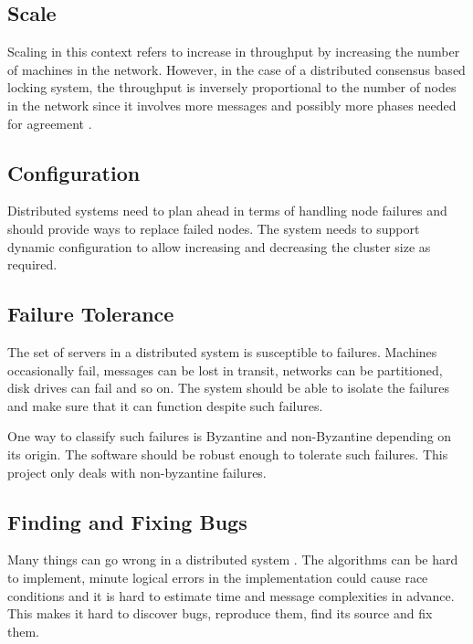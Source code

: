 \subsection{Scale}

Scaling in this context refers to increase in throughput by increasing the
number of machines in the network. However, in the case of a distributed 
consensus based locking system, the throughput is inversely proportional to the
number of nodes in the network since it involves more messages and possibly
more phases needed for agreement%
.

\subsection{Configuration}

Distributed systems need to plan ahead in terms of handling node failures and
should provide ways to replace failed nodes. The system needs to support dynamic
configuration to allow increasing and decreasing the cluster size as required.

\subsection{Failure Tolerance}

The set of servers in a distributed system is susceptible to failures.
Machines occasionally fail, messages can be lost in transit, networks can be
partitioned, disk drives can fail and so on. The system should be able to
isolate the failures and make sure that it can function despite such failures.

One way to classify such failures is Byzantine%
and non-Byzantine%
depending on its origin. The software should be robust enough to tolerate such
failures. This project only deals with non-byzantine failures.

\subsection{Finding and Fixing Bugs}

Many things can go wrong in a distributed system 
\citep{Rotem-gal-oz_fallaciesof}. The algorithms can be hard to implement, 
minute logical errors in the implementation could cause race conditions and
it is hard to estimate time and message complexities in advance. This makes it
hard to discover bugs, reproduce them, find its source and fix them.

